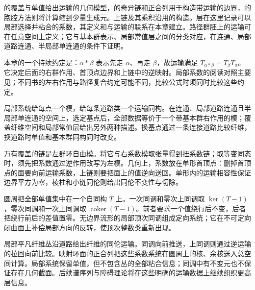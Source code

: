 \ProseParagraphBreak

的覆盖与单值给出运输的几何模型，的奇异链和正合列用于构造带运输的边界，的胞腔方法则将计算缩到少量生成元。上链及其乘积沿用的构造。层在这里记录可以局部选择并粘合的系数，其定义和与运输的联系在本章建立。路径群胚上的运输可在任意空间上定义；它与基本群表示、局部常值层之间的分类对应，在连通、局部道路连通、半局部单连通的条件下证明。

\ProseParagraphBreak

本章的一个持续约定是：\(\alpha*\beta\) 表示先走 \(\alpha\)、再走 \(\beta\)，故运输满足 \(T_{\alpha*\beta}=T_\beta T_\alpha\)。它决定后面的右群作用、首顶点边界和上链中的逆映射。局部系数的阅读对照主要见\cite[第3.H节]{Hatcher2002}；不同书的左右作用与路径复合约定可能不同，比较公式时须同时比较这些约定。






\begin{chaptersummary}
	局部系统给每点一个模，给每条道路类一个运输同构。在连通、局部道路连通且半局部单连通的空间上，选定基点后，全部数据等价于一个带基本群右作用的模；覆盖纤维空间和局部常值层给出另外两种描述。换基点通过一条连接道路比较纤维，换道路时单值和基本群同构同时改变。

	\ProseParagraphBreak

	万有覆盖的链是左群环自由模。将它与右系数模取张量得到扭系数链；取等变同态时，须先把系数通过逆作用改写为左模。几何上，系数放在单形首顶点：删掉首顶点的面要向前运输系数，上链则要把面上的值逆向送回。单形内的运输相容性保证边界平方为零，棱柱和小链同伦则给出同伦不变性与切除。

	\ProseParagraphBreak

	圆周把全部单值集中在一个自同构 \(T\) 上。一次同调和零次上同调取 \(\ker(T-1)\)，零次同调和一次上同调取 \(\operatorname{coker}(T-1)\)。前者要求一个值绕行后不变，后者把绕行前后的差值置零。无边界流形的局部顶次同调组成定向系统；它在不可定向闭曲面上补偿局部方向的反转，使顶次整数类重新出现。

	\ProseParagraphBreak

	局部平凡纤维丛沿道路给出纤维的同伦运输。同调向前推送，上同调则通过逆运输的拉回向前比较。映射环面的正合列把这些系数系统在圆周上的核、余核送入总空间计算。局部系统保留单值，但不包含丛的全部粘合信息；同调中有不变元也不保证存在几何截面。后续谱序列与障碍理论将在这些明确的运输数据上继续组织更高层信息。
\end{chaptersummary}

